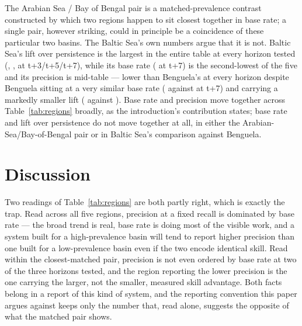  The Arabian Sea / Bay of
Bengal pair is a matched-prevalence contrast constructed by which two
regions happen to sit closest together in base rate; a single pair, however
striking, could in principle be a coincidence of these particular two
basins. The Baltic Sea's own numbers argue that it is not. Baltic Sea's
lift over persistence is the largest in the entire table at every horizon
tested (\HabBalticLiftThree{}, \HabBalticLiftFive{}, \HabBalticLiftSeven{}
at t+3/t+5/t+7), while its base rate (\HabBalticBaseSeven{} at t+7) is the
second-lowest of the five and its precision is mid-table --- lower than
Benguela's at every horizon despite Benguela sitting at a very similar base
rate (\HabBenguelaBaseSeven{} against \HabBalticBaseSeven{} at t+7) and
carrying a markedly smaller lift (\HabBenguelaLiftSeven{} against
\HabBalticLiftSeven{}). Base rate and precision move together across
Table~\ref{tab:regions} broadly, as the introduction's contribution states;
base rate and lift over persistence do not move together at all, in either
the Arabian-Sea/Bay-of-Bengal pair or in Baltic Sea's comparison against
Benguela.

\section{Discussion}
\label{sec:discussion}

Two readings of Table~\ref{tab:regions} are both partly right, which is
exactly the trap. Read across all five regions, precision at a fixed recall
is dominated by base rate --- the broad trend is real, base rate is doing
most of the visible work, and a system built for a high-prevalence basin
will tend to report higher precision than one built for a low-prevalence
basin even if the two encode identical skill. Read within the closest-matched
pair, precision is not even ordered by base rate at two of the three
horizons tested, and the region reporting the lower precision is the one
carrying the larger, not the smaller, measured skill advantage. Both facts
belong in a report of this kind of system, and the reporting convention this
paper argues against keeps only the number that, read alone, suggests the
opposite of what the matched pair shows.

